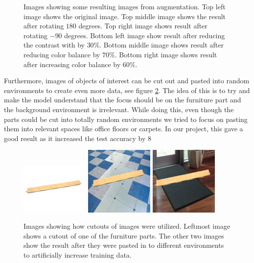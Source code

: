 \begin{figure}[hbtp]
\begin{center}
\caption{Images showing some resulting images from augmentation. Top left image shows the original image. Top middle image shows the result after rotating $180$ degrees. Top right image shows result after rotating $-90$ degrees. Bottom left image show result after  reducing the contrast with by $30\%$. Bottom middle image shows result after reducing color balance by $70\%$. Bottom right image shows result after increasing color balance by $60\%$.}
\label{fig:exampleArtificial}
\end{center}
\end{figure}


Furthermore, images of objects of interest can be cut out and pasted into random environments to create even more data, see figure \ref{fig:exampleCutout}.
The idea of this is to try and make the model understand that the focus should be on the furniture part and the background environment is irrelevant. While doing this, even though the parts could be cut into totally random environments we tried to focus on pasting them into relevant spaces like office floors or carpets.
In our project, this gave a good result as it increased the test accuracy by 8%

\begin{figure}[hbtp]
\begin{center}
\includegraphics[width = 0.3\textwidth]{./Images/image_13.jpg}
\includegraphics[width = 0.3\textwidth]{./Images/image_86.jpg}
\includegraphics[width = 0.3\textwidth]{./Images/image_107.jpg}
\caption{Images showing how cutouts of images were utilized. Leftmost image shows a cutout of one of the furniture parts. The other two images show the result after they were pasted in to different environments to artificially increase training data.}
\label{fig:exampleCutout}
\end{center}
\end{figure}


